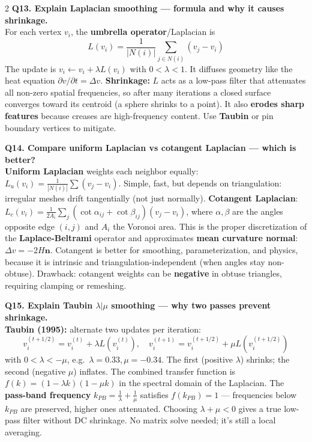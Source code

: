 \begin{paracol}{2}
\textbf{Q13. Explain Laplacian smoothing — formula and why it causes shrinkage.}\\
For each vertex $v_i$, the \textbf{umbrella operator}/Laplacian is
\[
L(v_i) = \frac{1}{|N(i)|}\sum_{j\in N(i)} (v_j - v_i)
\]
The update is $v_i \leftarrow v_i + \lambda L(v_i)$ with $0 < \lambda < 1$. It diffuses geometry like the heat equation $\partial v/\partial t = \Delta v$. \textbf{Shrinkage:} $L$ acts as a low-pass filter that attenuates all non-zero spatial frequencies, so after many iterations a closed surface converges toward its centroid (a sphere shrinks to a point). It also \textbf{erodes sharp features} because creases are high-frequency content. Use \textbf{Taubin} or pin boundary vertices to mitigate.

\textbf{Q14. Compare uniform Laplacian vs cotangent Laplacian — which is better?}\\
\textbf{Uniform Laplacian} weights each neighbor equally: $L_u(v_i)=\tfrac{1}{|N(i)|}\sum (v_j-v_i)$. Simple, fast, but depends on triangulation: irregular meshes drift tangentially (not just normally). \textbf{Cotangent Laplacian}: $L_c(v_i)=\tfrac{1}{2A_i}\sum_j (\cot\alpha_{ij}+\cot\beta_{ij})(v_j-v_i)$, where $\alpha,\beta$ are the angles opposite edge $(i,j)$ and $A_i$ the Voronoi area. This is the proper discretization of the \textbf{Laplace-Beltrami} operator and approximates \textbf{mean curvature normal}: $\Delta v = -2H\mathbf{n}$. Cotangent is better for smoothing, parameterization, and physics, because it is intrinsic and triangulation-independent (when angles stay non-obtuse). Drawback: cotangent weights can be \textbf{negative} in obtuse triangles, requiring clamping or remeshing.

\textbf{Q15. Explain Taubin $\lambda|\mu$ smoothing — why two passes prevent shrinkage.}\\
\textbf{Taubin (1995):} alternate two updates per iteration:
\[
v_i^{(t+1/2)} = v_i^{(t)} + \lambda L(v_i^{(t)}), \quad v_i^{(t+1)} = v_i^{(t+1/2)} + \mu L(v_i^{(t+1/2)})
\]
with $0 < \lambda < -\mu$, e.g.\ $\lambda=0.33, \mu=-0.34$. The first (positive $\lambda$) shrinks; the second (negative $\mu$) inflates. The combined transfer function is $f(k)=(1-\lambda k)(1-\mu k)$ in the spectral domain of the Laplacian. The \textbf{pass-band frequency} $k_{PB}=\tfrac{1}{\lambda}+\tfrac{1}{\mu}$ satisfies $f(k_{PB})=1$ — frequencies below $k_{PB}$ are preserved, higher ones attenuated. Choosing $\lambda+\mu < 0$ gives a true low-pass filter without DC shrinkage. No matrix solve needed; it's still a local averaging.


\end{paracol}
